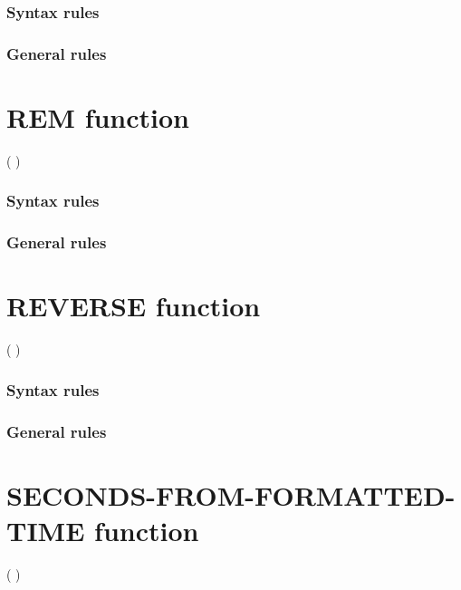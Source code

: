 \subsubsection{Syntax rules}

\subsubsection{General rules}

\section{REM function}

\begin{syntax}
    ( \argument \argument )
\end{syntax}

\subsubsection{Syntax rules}

\subsubsection{General rules}

\section{REVERSE function}

\begin{syntax}
    ( \argument )
\end{syntax}

\subsubsection{Syntax rules}

\subsubsection{General rules}

\section{SECONDS-FROM-FORMATTED-TIME function}

\begin{syntax}
    ( \argument \argument )
\end{syntax}

